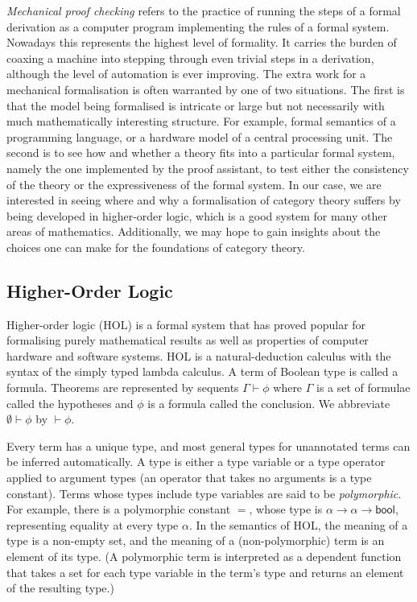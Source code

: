 \documentclass[twoside,titlepage,11pt]{article}
\begin{document}
\emph{Mechanical proof checking} refers to the practice of running the steps of a formal derivation as a computer program implementing the rules of a formal system.
Nowadays this represents the highest level of formality.
It carries the burden of coaxing a machine into stepping through even trivial steps in a derivation, although the level of automation is ever improving.
The extra work for a mechanical formalisation is often warranted by one of two situations.
The first is that the model being formalised is intricate or large but not necessarily with much mathematically interesting structure.
For example, formal semantics of a programming language, or a hardware model of a central processing unit.
The second is to see how and whether a theory fits into a particular formal system, namely the one implemented by the proof assistant, to test either the consistency of the theory or the expressiveness of the formal system.
In our case, we are interested in seeing where and why a formalisation of category theory suffers by being developed in higher-order logic, which is a good system for many other areas of mathematics.
Additionally, we may hope to gain insights about the choices one can make for the foundations of category theory.%
\subsection{Higher-Order Logic}%
\newcommand{\bool}{\ensuremath{\mathsf{bool}}}
Higher-order logic (HOL) is a formal system that has proved popular for formalising purely mathematical results as well as properties of computer hardware and software systems.
HOL is a natural-deduction calculus with the syntax of the simply typed lambda calculus.
A term of Boolean type is called a formula.
Theorems are represented by sequents $\Gamma\vdash \phi$ where $\Gamma$ is a set of formulae called the hypotheses and $\phi$ is a formula called the conclusion.
We abbreviate $\emptyset\vdash\phi$ by $\vdash\phi$.%


Every term has a unique type, and most general types for unannotated terms can be inferred automatically.
A type is either a type variable or a type operator applied to argument types (an operator that takes no arguments is a type constant).
Terms whose types include type variables are said to be \emph{polymorphic}.
For example, there is a polymorphic constant $=$, whose type is $\alpha\to\alpha\to\bool$, representing equality at every type $\alpha$.
In the semantics of HOL, the meaning of a type is a non-empty set, and the meaning of a (non-polymorphic) term is an element of its type.
(A polymorphic term is interpreted as a dependent function that takes a set for each type variable in the term's type and returns an element of the resulting type.)
\end{document}
